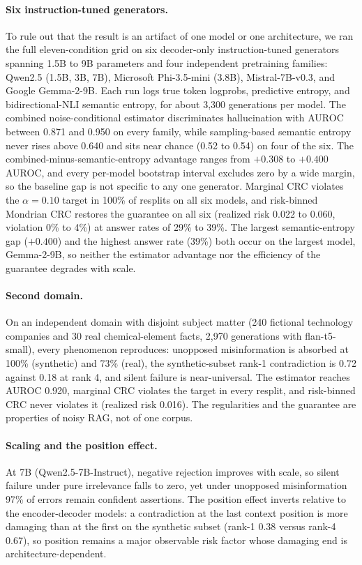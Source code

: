 \documentclass[sn-basic]{sn-jnl}
\theoremstyle{thmstyleone}
\theoremstyle{thmstyletwo}
\begin{document}
\paragraph{Six instruction-tuned generators.}
To rule out that the result is an artifact of one model or one
architecture, we ran the full eleven-condition grid on six decoder-only
instruction-tuned generators spanning 1.5B to 9B parameters and four
independent pretraining families: Qwen2.5 (1.5B, 3B, 7B), Microsoft
Phi-3.5-mini (3.8B), Mistral-7B-v0.3, and Google Gemma-2-9B. Each run
logs true token logprobs, predictive entropy, and bidirectional-NLI
semantic entropy, for about 3{,}300 generations per model. The combined
noise-conditional estimator discriminates hallucination with AUROC
between 0.871 and 0.950 on every family, while sampling-based semantic
entropy never rises above 0.640 and sits near chance (0.52 to 0.54) on
four of the six. The combined-minus-semantic-entropy advantage ranges
from $+0.308$ to $+0.400$ AUROC, and every per-model bootstrap interval
excludes zero by a wide margin, so the baseline gap is not specific to
any one generator. Marginal CRC violates the $\alpha = 0.10$ target in
100\% of resplits on all six models, and risk-binned Mondrian CRC
restores the guarantee on all six (realized risk 0.022 to 0.060,
violation 0\% to 4\%) at answer rates of 29\% to 39\%. The largest
semantic-entropy gap ($+0.400$) and the highest answer rate (39\%) both
occur on the largest model, Gemma-2-9B, so neither the estimator
advantage nor the efficiency of the guarantee degrades with scale.

\paragraph{Second domain.}
On an independent domain with disjoint subject matter (240 fictional technology
companies and 30 real chemical-element facts, 2{,}970 generations with
flan-t5-small), every phenomenon reproduces: unopposed misinformation is
absorbed at 100\% (synthetic) and 73\% (real), the synthetic-subset rank-1
contradiction is 0.72 against 0.18 at rank 4, and silent failure is near-universal. The estimator
reaches AUROC 0.920, marginal CRC violates the target in every resplit, and
risk-binned CRC never violates it (realized risk 0.016). The regularities and
the guarantee are properties of noisy RAG, not of one corpus.

\paragraph{Scaling and the position effect.}
At 7B (Qwen2.5-7B-Instruct), negative rejection improves with scale, so silent
failure under pure irrelevance falls to zero, yet under unopposed misinformation
97\% of errors remain confident assertions. The position effect inverts relative
to the encoder-decoder models: a contradiction at the last context position is
more damaging than at the first on the synthetic subset (rank-1 0.38 versus
rank-4 0.67), so position
remains a major observable risk factor whose damaging end is
architecture-dependent.
\end{document}
